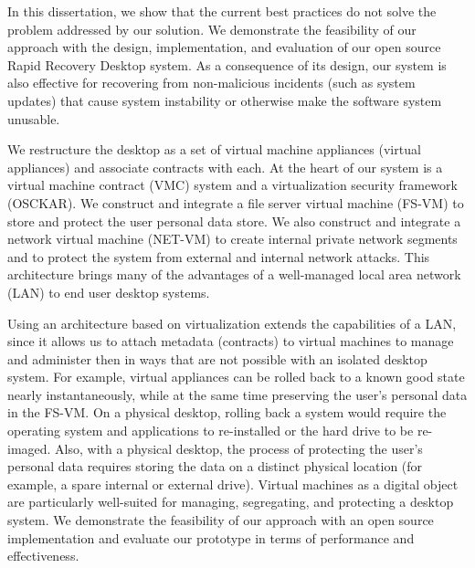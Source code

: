 In this dissertation, we show that the current best practices do not solve the problem addressed by our solution. We demonstrate the feasibility of our approach with the design, implementation, and evaluation of our open source Rapid Recovery Desktop system. As a consequence of its design, our system is also effective for recovering from non-malicious incidents (such as system updates) that cause system instability or otherwise make the software system unusable. 

We restructure the desktop as a set of virtual machine appliances (virtual appliances) and associate contracts with each. At the heart of our system is a virtual machine contract (VMC) system and a virtualization security framework (OSCKAR). We construct and integrate a file server virtual machine (FS-VM) to store and protect the user personal data store. We also construct and integrate a network virtual machine (NET-VM) to create internal private network segments and to protect the system from external and internal network attacks. This architecture brings many of the advantages of a well-managed local area network (LAN) to end user desktop systems.

Using an architecture based on virtualization extends the capabilities of a LAN, since it allows us to attach metadata (contracts) to virtual machines to manage and administer then in ways that are not possible with an isolated desktop system. For example, virtual appliances can be rolled back to a known good state nearly instantaneously, while at the same time preserving the user's personal data in the FS-VM. On a physical desktop, rolling back a system would require the operating system and applications to re-installed or the hard drive to be re-imaged. Also, with a physical desktop, the process of protecting the user's personal data requires storing the data on a distinct physical location (for example, a spare internal or external drive). Virtual machines as a digital object are particularly well-suited for managing, segregating, and protecting a desktop system. We demonstrate the feasibility of our approach with an open source implementation and evaluate our prototype in terms of performance and effectiveness.

